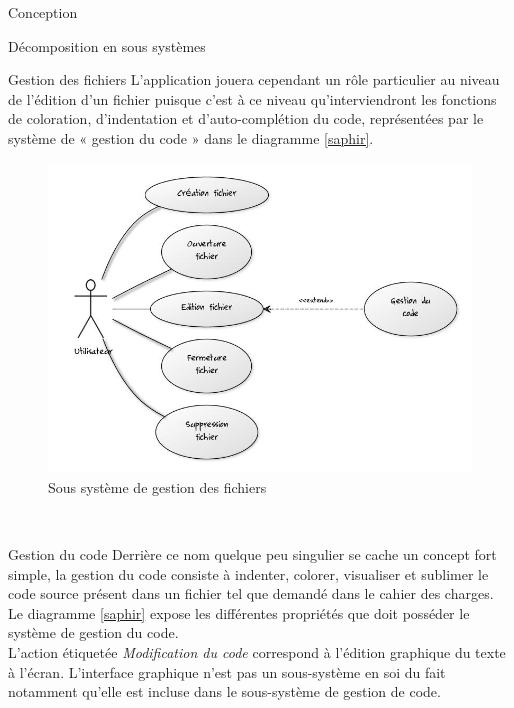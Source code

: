 \documentclass[a4paper, 12pt]{report}
\begin{document}
\begin{part}{Conception}
\begin{chapter}{Décomposition en sous systèmes}
\begin{section}{Gestion des fichiers}
				L'application jouera cependant un rôle particulier au niveau de l'édition d'un fichier puisque c'est à ce niveau qu'interviendront
				les fonctions de coloration, d'indentation et d'auto-complétion du code, représentées par le système de « gestion du code » dans le 
				diagramme \ref{saphir}. \\
				\begin{figure}[ht]
					\begin{center}
						\includegraphics[width=13cm]{images/gestionFichiers.jpg}
						\caption{Sous système de gestion des fichiers}
						\label{carabine}
					\end{center}
				\end{figure}~\\
			\end{section}
			\newpage %
			\begin{section}{Gestion du code}
				Derrière ce nom quelque peu singulier se cache un concept fort simple, la gestion du code consiste à indenter, colorer,
				visualiser et sublimer le code source présent dans un fichier tel que demandé dans le cahier des charges. Le diagramme \ref{saphir}
				expose les différentes propriétés que doit posséder le système de gestion du code.\\
				L'action étiquetée \emph{Modification du code} correspond à l'édition graphique du texte à l'écran. L'interface graphique
				n'est pas un sous-système en soi du fait notamment qu'elle est incluse dans le sous-système de gestion de code.\\
				\begin{figure}[ht]
					\begin{center}

\end{center}
\end{figure}
\end{section}
\end{chapter}
\end{part}
\end{document}
